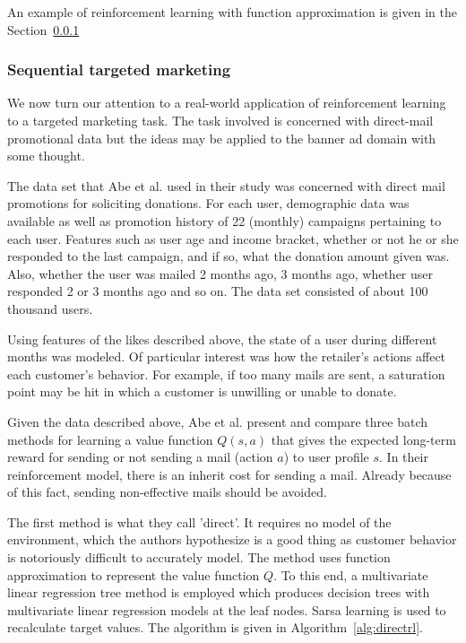\documentclass{article} %
\begin{document}
An example of reinforcement learning with function approximation is given in
the Section~\ref{sec:sequential-targeted-marketing}

\subsubsection{Sequential targeted marketing}
\label{sec:sequential-targeted-marketing}
We now turn our attention to a real-world application of reinforcement learning
to a targeted marketing task. The task \cite{abe2002empirical} involved is
concerned with direct-mail promotional data but the ideas may be applied to the
banner ad domain with some thought.

The data set that Abe et al. \cite{abe2002empirical} used in their study was
concerned with direct mail promotions for soliciting donations. For each user,
demographic data was available as well as promotion history of 22 (monthly)
campaigns pertaining to each user.  Features such as user age and income
bracket, whether or not he or she responded to the last campaign, and if so,
what the donation amount given was.  Also, whether the user was mailed 2 months
ago, 3 months ago, whether user responded 2 or 3 months ago and so on. The data
set consisted of about 100 thousand users.

Using features of the likes described above, the state of a user during
different months was modeled. Of particular interest was how the retailer's
actions affect each customer's behavior. For example, if too many mails are
sent, a saturation point may be hit in which a customer is unwilling or unable
to donate.

Given the data described above, Abe et al. \cite{abe2002empirical} present
and compare three batch methods for learning a value function $Q(s,a)$ that
gives the expected long-term reward for sending or not sending a mail (action
$a$) to user profile $s$. In their reinforcement model, there is an inherit
cost for sending a mail. Already because of this fact, sending non-effective
mails should be avoided.

The first method is what they call 'direct'. It requires no model of the
environment, which the authors hypothesize is a good thing as customer behavior
is notoriously difficult to accurately model. The method uses function
approximation to represent the value function $Q$. To this end, a multivariate
linear regression tree method is employed which produces decision trees with
multivariate linear regression models at the leaf nodes. Sarsa learning is used
to recalculate target values. The algorithm is given in
Algorithm~\ref{alg:directrl}.
\end{document}
